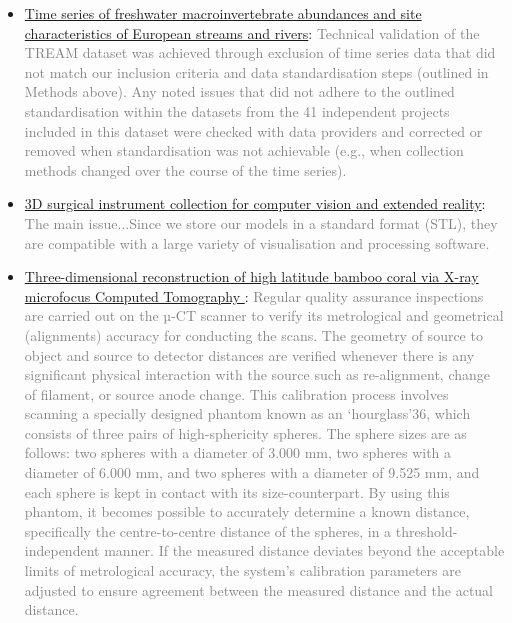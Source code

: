 \documentclass[fleqn,10pt]{wlscirep}
\begin{document}
\begin{itemize}
\begin{itemize}
\begin{itemize}
      \item
      \href{https://www.nature.com/articles/s41597-024-03445-3?_gl=1*1ikco52*_up*MQ..&gclid=EAIaIQobChMInOXO84DVhgMViewWBR3vWQJAEAAYASAAEgJICfD_BwE#Sec11}{Time series of freshwater macroinvertebrate abundances and site characteristics of European streams and rivers}: \textcolor{gray}{Technical validation of the TREAM dataset was achieved through exclusion of time series data that did not match our inclusion criteria and data standardisation steps (outlined in Methods above). Any noted issues that did not adhere to the outlined standardisation within the datasets from the 41 independent projects included in this dataset were checked with data providers and corrected or removed when standardisation was not achievable (e.g., when collection methods changed over the course of the time series).}
      
      \item
      \href{https://www.nature.com/articles/s41597-023-02684-0?_gl=1*1t69zgo*_up*MQ..&gclid=EAIaIQobChMInOXO84DVhgMViewWBR3vWQJAEAAYASAAEgJICfD_BwE#Sec12}{3D surgical instrument collection for computer vision and extended reality}: \textcolor{gray}{The main issue...Since we store our models in a standard format (STL), they are compatible with a large variety of visualisation and processing software.}
      
      \item
      \href{https://www.nature.com/articles/s41597-024-03396-9?_gl=1*1ikco52*_up*MQ..&gclid=EAIaIQobChMInOXO84DVhgMViewWBR3vWQJAEAAYASAAEgJICfD_BwE#Sec4}{Three-dimensional reconstruction of high latitude bamboo coral via X-ray microfocus Computed Tomography
}: \textcolor{gray}{Regular quality assurance inspections are carried out on the µ-CT scanner to verify its metrological and geometrical (alignments) accuracy for conducting the scans. The geometry of source to object and source to detector distances are verified whenever there is any significant physical interaction with the source such as re-alignment, change of filament, or source anode change. This calibration process involves scanning a specially designed phantom known as an ‘hourglass’36, which consists of three pairs of high-sphericity spheres. The sphere sizes are as follows: two spheres with a diameter of 3.000 mm, two spheres with a diameter of 6.000 mm, and two spheres with a diameter of 9.525 mm, and each sphere is kept in contact with its size-counterpart. By using this phantom, it becomes possible to accurately determine a known distance, specifically the centre-to-centre distance of the spheres, in a threshold-independent manner. If the measured distance deviates beyond the acceptable limits of metrological accuracy, the system’s calibration parameters are adjusted to ensure agreement between the measured distance and the actual distance.}
      
      \end{itemize}
      
    \end{itemize}
  
\end{itemize}
\fi
\end{document}
